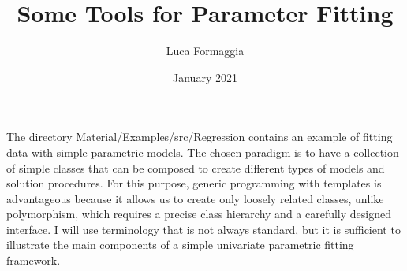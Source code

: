 \documentclass{article}
\author{Luca Formaggia}
\title{Some Tools for Parameter Fitting}
\date{January 2021}
\newcommand{\onlyprogramname}[1]{Material/Examples/src/#1}
\begin{document}
\maketitle

The directory \onlyprogramname{Regression} contains an example of fitting data with simple parametric models. The chosen paradigm is to have a collection of simple classes that can be composed to create different types of models and solution procedures. For this purpose, generic programming with templates is advantageous because it allows us to create only loosely related classes, unlike polymorphism, which requires a precise class hierarchy and a carefully designed interface. I will use terminology that is not always standard, but it is sufficient to illustrate the main components of a simple univariate parametric fitting framework.
\end{document}
